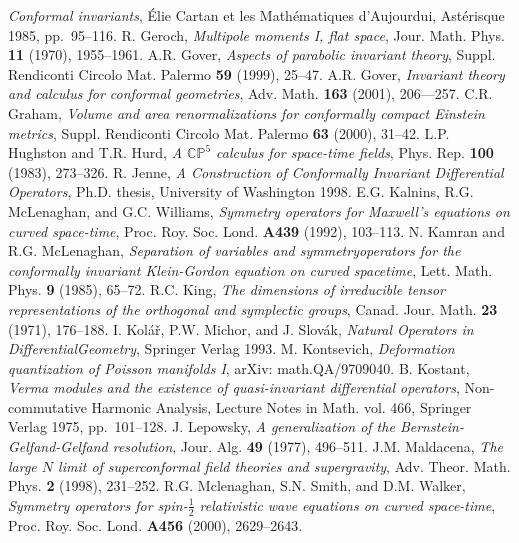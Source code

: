 \documentclass[a4paper,12pt]{amsart}
\begin{document}
\begin{thebibliography}{XX}
{\em Conformal invariants},
\'Elie Cartan et les Math\'ematiques d'Aujourdui,
Ast\'erisque 1985, pp.~95--116.
 R. Geroch,
{\em Multipole moments I, flat space},
Jour. Math. Phys. {\bf 11} (1970), 1955--1961.
 A.R. Gover,
{\em Aspects of parabolic invariant theory},
Suppl. Rendiconti Circolo Mat. Palermo {\bf 59} (1999), 25--47.
 A.R. Gover,
{\em Invariant theory and calculus for conformal geometries},
Adv. Math. {\bf 163} (2001), 206---257.
 C.R. Graham,
{\em Volume and area renormalizations for conformally compact Einstein
metrics},
Suppl. Rendiconti Circolo Mat. Palermo {\bf 63} (2000), 31--42.
 L.P. Hughston and T.R. Hurd,
{\em A ${\mathbb{CP}}^5$ calculus for space-time fields},
Phys. Rep. {\bf 100} (1983), 273--326.
 R. Jenne,
{\em A Construction of Conformally Invariant Differential Operators},
Ph.D. thesis, University of Washington 1998.
 E.G. Kalnins, R.G. McLenaghan, and G.C. Williams,
{\em Symmetry operators for Maxwell's equations on curved space-time},
Proc. Roy. Soc. Lond. {\bf A439} (1992), 103--113.
 N. Kamran and R.G. McLenaghan,
{\em Separation of variables and symmetry\linebreak operators for the
conformally invariant Klein-Gordon equation on curved spacetime},
Lett. Math. Phys. {\bf 9} (1985), 65--72.
 R.C. King,
{\em The dimensions of irreducible tensor representations of the\linebreak
orthogonal and
symplectic groups},
Canad. Jour. Math. {\bf 23} (1971), 176--188.
 I. Kol\'a\v{r}, P.W. Michor, and J. Slov\'ak,
{\em Natural Operators in Differential\linebreak Geometry},
Springer Verlag 1993.
 M. Kontsevich,
{\em Deformation quantization of Poisson manifolds I},
arXiv: math.QA/9709040.
 B. Kostant,
{\em Verma modules and the existence of quasi-invariant differential
operators},
Non-commutative Harmonic Analysis,
Lecture Notes in Math. vol. 466, Springer Verlag 1975, pp.~101--128.
 J. Lepowsky,
{\em A generalization of the Bernstein-Gelfand-Gelfand resolution},
Jour. Alg. {\bf 49} (1977), 496--511.
 J.M. Maldacena,
{\em The large $N$ limit of superconformal field theories and
\linebreak supergravity},
Adv. Theor. Math. Phys. {\bf 2} (1998), 231--252.
 R.G. Mclenaghan, S.N. Smith, and D.M. Walker,
{\em Symmetry operators for spin-$\frac12$ relativistic wave equations on
curved space-time},
Proc. Roy. Soc. Lond. {\bf A456} (2000), 2629--2643.

\end{thebibliography}
\end{document}
